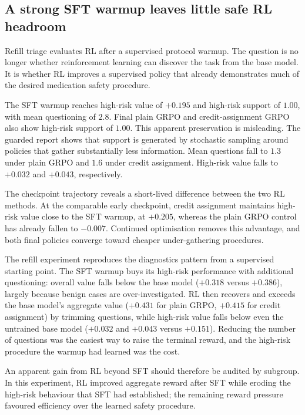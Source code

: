 \documentclass{article}
\begin{document}
\FloatBarrier
\subsection{A strong SFT warmup leaves little safe RL headroom}
\label{subsec:bridge-result}

Refill triage evaluates RL after a supervised protocol warmup. The question is no
longer whether reinforcement learning can discover the task from the base model.
It is whether RL improves a supervised policy that already demonstrates much of
the desired medication safety procedure.

The SFT warmup reaches high-risk value of $+0.195$ and high-risk support of
$1.00$, with mean questioning of $2.8$. Final plain GRPO and credit-assignment GRPO also show high-risk support of $1.00$. This apparent preservation is
misleading. The guarded report shows that support is generated by stochastic
sampling around policies that gather substantially less information. Mean
questions fall to $1.3$ under plain GRPO and $1.6$ under credit assignment.
High-risk value falls to $+0.032$ and $+0.043$, respectively.

The checkpoint trajectory reveals a short-lived difference between the two RL
methods. At the comparable early checkpoint, credit assignment maintains high-risk value close to the SFT warmup, at $+0.205$, whereas the plain GRPO control
has already fallen to $-0.007$. Continued optimisation removes this advantage,
and both final policies converge toward cheaper under-gathering procedures.

The refill experiment reproduces the diagnostics pattern from a supervised starting
point. The SFT warmup buys its high-risk performance with additional questioning:
overall value falls below the base model ($+0.318$ versus $+0.386$), largely because
benign cases are over-investigated. RL then recovers and exceeds the base model's
aggregate value ($+0.431$ for plain GRPO, $+0.415$ for credit assignment) by trimming
questions, while high-risk value falls below even the untrained base model ($+0.032$
and $+0.043$ versus $+0.151$). Reducing the number of questions was the easiest way to
raise the terminal reward, and the high-risk procedure the warmup had learned was the
cost.

An apparent gain from RL beyond SFT should therefore be audited by subgroup. In this
experiment, RL improved aggregate reward after SFT while eroding the high-risk
behaviour that SFT had established; the remaining reward pressure favoured efficiency
over the learned safety procedure.
\end{document}
